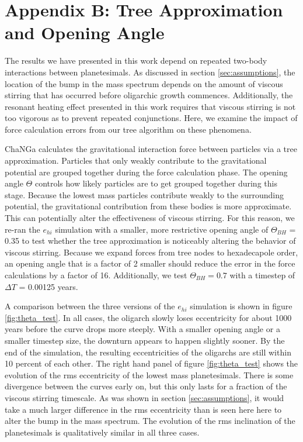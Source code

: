 \section{Appendix B: Tree Approximation and Opening Angle}\label{sec:openAngle}

The results we have presented in this work depend on repeated two-body interactions between planetesimals. As discussed in 
section \ref{sec:assumptions}, the location of the bump in the mass spectrum depends on the amount of viscous stirring that 
has occurred before oligarchic growth commences. Additionally, the resonant heating effect presented in this work requires that 
viscous stirring is not too vigorous as to prevent repeated conjunctions. Here, we examine the impact of force calculation errors 
from our tree algorithm on these phenomena.

{\sc ChaNGa} calculates the gravitational interaction force between particles via a tree approximation. Particles that only weakly 
contribute to the gravitational potential are grouped together during the force calculation phase. The opening angle $\Theta$ 
controls how likely particles are to get grouped together during this stage. Because the lowest mass particles contribute weakly 
to the surrounding potential, the gravitational contribution from these bodies is more approximate. This can potentially alter the 
effectiveness of viscous stirring. For this reason, we re-ran the $e_{hi}$ simulation with a smaller, more restrictive opening 
angle of $\Theta_{BH}$ = 0.35 to test whether the tree approximation is noticeably altering the behavior of viscous stirring. 
Because we expand forces from tree nodes to hexadecapole order, an opening angle that is a factor of 2 smaller should reduce 
the error in the force calculations by a factor of 16. Additionally, we test $\Theta_{BH} = 0.7$ with a timestep of $\Delta T$ = 
0.00125 years.

A comparison between the three versions of the $e_{hi}$ simulation is shown in figure \ref{fig:theta_test}. In all cases, the 
oligarch slowly loses eccentricity for about 1000 years before the curve drops more steeply. With a smaller opening angle or a 
smaller timestep size, the downturn appears to happen slightly sooner. By the end of the simulation, the resulting eccentricities 
of the oligarchs are still within 10 percent of each other. The right hand panel of figure \ref{fig:theta_test} shows the evolution of 
the rms eccentricity of the lowest mass planetesimals. There is some divergence between the curves early on, but this only 
lasts for a fraction of the viscous stirring timescale. As was shown in section \ref{sec:assumptions}, it would take a much larger 
difference in the rms eccentricity than is seen here here to alter the bump in the mass spectrum. The evolution of the rms 
inclination of the planetesimals is qualitatively similar in all three cases.